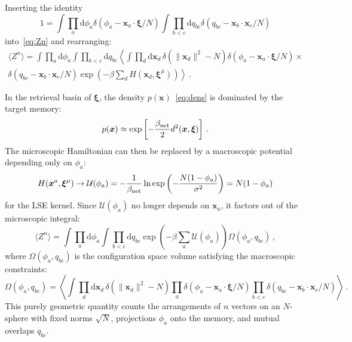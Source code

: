 \documentclass{article}
\newcommand{\dd}{{\mathrm{d}}}
\theoremstyle{plain}
\theoremstyle{definition}
\theoremstyle{remark}
\begin{document}
Inserting the identity
\begin{equation}
1 = \int \prod_a \dd \phi_a \delta\left(\phi_a - \bm{x}_a \cdot \bm{\xi}/N\right) 
\int \prod_{b<c} \dd q_{bc} \delta\left(q_{bc} - \bm{x}_b \cdot \bm{x}_c/N\right)
\end{equation}
into~\eqref{eq:Zn} and rearranging:
\begin{multline}
\langle Z^n \rangle = \int \prod_a \dd \phi_a \int \prod_{b<c} \dd q_{bc} \left\langle \int \prod_d \dd \bm{x}_d \, \delta(\|\bm{x}_d\|^2 - N) \delta(\phi_a - \bm{x}_a \cdot \bm{\xi}/N) \right. \times \\
\left.  \delta(q_{bc} - \bm{x}_b \cdot \bm{x}_c/N) \exp\left(-\beta \sum_d H(\bm{x}_d, \bm{\xi}^\mu)\right) \right\rangle \,.
\end{multline}

In the retrieval basin of $\bm{\xi}$, the density $p(\bm{x})$~\eqref{eq:dens} is dominated by the target memory:
\begin{equation}
    p(\bm{x}) \approx \exp\left[ - \frac{\beta_{\rm net}}{2} d^2(\bm{x}, \bm{\xi}) \right] \,.
    \label{eq:dens_red}    
\end{equation}
The microscopic Hamiltonian can then be replaced by a macroscopic potential depending only on $\phi_a$:
\begin{equation}
    H(\bm{x}^a, \bm{\xi}^\mu) \to \mathcal{U}(\phi_a) = -\frac{1}{\beta_{\rm net}} \ln \exp\left( -\frac{N(1 - \phi_a)}{\sigma^2} \right) = N(1-\phi_a)
\end{equation}
for the LSE kernel. Since $\mathcal{U}(\phi_a)$ no longer depends on $\bm{x}_a$, it factors out of the microscopic integral:
\begin{equation}
    \langle Z^n \rangle = \int \prod_a \dd \phi_a \int \prod_{b<c} \dd q_{bc} \exp\left(-\beta \sum_a \mathcal{U}(\phi_a)\right) \Omega(\phi_a, q_{bc})\,,
\end{equation}
where $\Omega(\phi_a, q_{bc})$ is the configuration space volume satisfying the macroscopic constraints:
\begin{equation}
\Omega(\phi_a, q_{bc}) = \left\langle \int \prod_d \dd \bm{x}_d \,\delta(\|\bm{x}_d\|^2 - N) \prod_a \delta(\phi_a - \bm{x}_a \cdot \bm{\xi}/N) \prod_{b<c} \delta(q_{bc} - \bm{x}_b \cdot \bm{x}_c/N) \right\rangle\,.
\end{equation}
This purely geometric quantity counts the arrangements of $n$ vectors on an $N$-sphere with fixed norms $\sqrt{N}$, projections $\phi_a$ onto the memory, and mutual overlaps $q_{bc}$.
\end{document}
